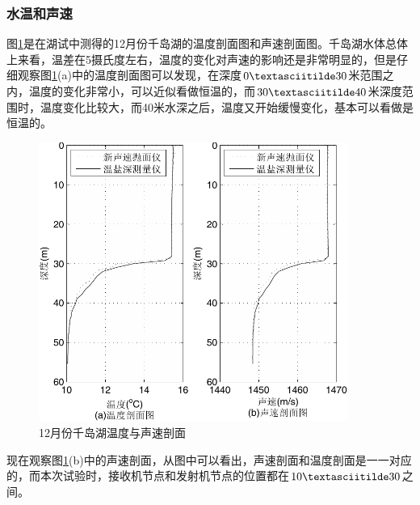\subsubsection*{水温和声速}
图\ref{fig:6.5}是在湖试中测得的12月份千岛湖的温度剖面图和声速剖面图。千岛湖水体总体上来看，温差在5摄氏度左右，温度的变化对声速的影响还是非常明显的，但是仔细观察图\ref{fig:6.5}(a)中的温度剖面图可以发现，在深度$0\textasciitilde
30$米范围之内，温度的变化非常小，可以近似看做恒温的，而$30\textasciitilde
40$米深度范围时，温度变化比较大，而40米水深之后，温度又开始缓慢变化，基本可以看做是恒温的。
\begin{figure}[htb]
  \begin{center}
    \includegraphics[width=0.9\textwidth]{images/speedTemp.pdf}
  \end{center}
  \caption{12月份千岛湖温度与声速剖面}
  \label{fig:6.5}
\end{figure}

现在观察图\ref{fig:6.5}(b)中的声速剖面，从图中可以看出，声速剖面和温度剖面是一一对应的，而本次试验时，接收机节点和发射机节点的位置都在$10\textasciitilde
30$之间。

